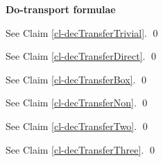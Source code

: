 {\bf Do-transport formulae}

\begin{claim}
\decTransferTrivial
\end{claim}
\proof
See Claim \ref{cl-decTransferTrivial}.
\qed


\begin{claim}
\decTransferDirect
\end{claim}
\proof
See Claim \ref{cl-decTransferDirect}.
\qed


\begin{claim}
\decTransferBox
\end{claim}
\proof
See Claim 
\ref{cl-decTransferBox}.
\qed



\begin{claim}
\decTransferNon
\end{claim}
\proof
See Claim 
\ref{cl-decTransferNon}.
\qed

\begin{claim}
\decTransferTwo
\end{claim}
\proof
See Claim \ref{cl-decTransferTwo}.
\qed

\begin{claim}
\decTransferThree
\end{claim}
\proof
See Claim \ref{cl-decTransferThree}.
\qed